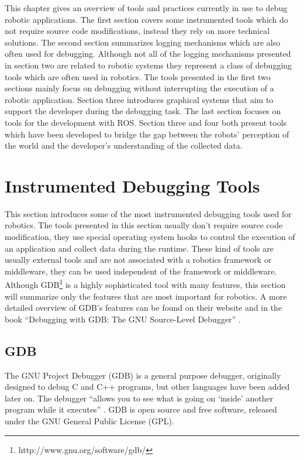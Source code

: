 This chapter gives an overview of tools and practices currently in use to debug robotic applications. The first section covers some instrumented tools which do not require source code modifications, instead they rely on more technical solutions. The second section summarizes logging mechanisms which are also often used for debugging. Although not all of the logging mechanisms presented in section two are related to robotic systems they represent a class of debugging tools which are often used in robotics. The tools presented in the first two sections mainly focus on debugging without interrupting the execution of a robotic application. Section three introduces graphical systems that aim to support the developer during the debugging task. The last section focuses on tools for the development with ROS. Section three and four both present tools which have been developed to bridge the gap between the robots' perception of the world and the developer's understanding of the collected data.


\section{Instrumented Debugging Tools}
This section introduces some of the most instrumented  debugging tools used for robotics. The tools presented in this section usually don't require source code modification, they use special operating system hooks to control the execution of an application and collect data during the runtime. These kind of tools are usually external tools and are not associated with a robotics framework or middleware, they can be used independent of the framework or middleware. Although GDB\footnote{http://www.gnu.org/software/gdb/} is a highly sophisticated tool with many features, this section will summarize only the features that are most important for robotics. A more detailed overview of GDB's features can be found on their website and in the book ``Debugging with GDB: The GNU Source-Level Debugger'' \cite{Stallman2002}.

\subsection{GDB}
The GNU Project Debugger (GDB) is a general purpose debugger, originally designed to debug C and C++ programs, but other languages have been added later on. The debugger ``allows you to see what is going on `inside' another program while it executes'' \cite{Stallman2002}. GDB is open source and free software, released under the GNU General Public License (GPL).

